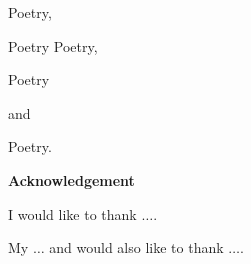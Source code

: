 \documentclass[a4paper,11pt,twoside,chapterprefix=TRUE]{scrbook}
\newenvironment{calligraphic}{\usefont{T1}{pzc}{m}{it}}{}
\begin{document}
\newpage
\thispagestyle{empty}
\mbox{}
\clearpage


\newpage
\thispagestyle{empty}

\vspace*{180pt}
\bigskip

\bigskip

\bigskip


\begin{center}
\begin{huge}
\begin{slshape}
{\fontUbuntu \slshape

Poetry,

\bigskip

Poetry 
Poetry,

\bigskip

Poetry

\bigskip

and

\bigskip

Poetry. }
\end{slshape}
\end{huge}
\end{center}

\newpage
\thispagestyle{empty}
\mbox{}
\clearpage

\newpage

\vspace{30pt}

\thispagestyle{empty}
\begin{center}
{\huge \bfseries \fontUbuntu Acknowledgement}  
\end{center}

\vspace{30pt}

{\large \fontUbuntu I would like to thank $\ldots$. }

\vspace{15pt}

{\large \fontUbuntu My $\ldots$ and would also like to thank $\ldots$.}

\vspace{15pt}
\end{document}
